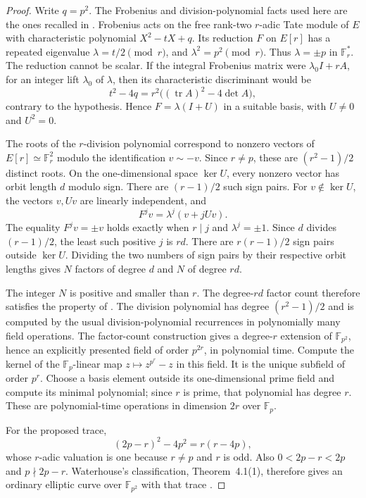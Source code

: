 \documentclass[11pt]{article}
\theoremstyle{definition}
\theoremstyle{remark}
\begin{document}
\begin{proof}
Write $q=p^2$.  The Frobenius and division-polynomial facts used here
are the ones recalled in \cite[\S2, pp.~485--486]{Schoof1985}.
Frobenius acts on the free rank-two $r$-adic Tate
module of $E$ with characteristic polynomial $X^2-tX+q$.
Its reduction $F$ on $E[r]$ has a repeated eigenvalue
$\lambda=t/2\pmod r$, and $\lambda^2=p^2\pmod r$.
Thus $\lambda=\pm p$ in $\mathbb F_r^*$.
The reduction cannot be scalar.  If the integral Frobenius matrix
were $\lambda_0I+rA$, for an integer lift $\lambda_0$ of $\lambda$,
then its characteristic discriminant would be
\[
 t^2-4q=r^2\bigl((\operatorname{tr}A)^2-4\det A\bigr),
\]
contrary to the hypothesis.  Hence
$F=\lambda(I+U)$ in a suitable basis, with $U\ne0$ and $U^2=0$.

The roots of the $r$-division polynomial correspond to nonzero
vectors of $E[r]\simeq\mathbb F_r^2$ modulo the identification
$v\sim-v$.  Since $r\ne p$, these are $(r^2-1)/2$ distinct roots.
On the one-dimensional space $\ker U$, every nonzero vector has
orbit length $d$ modulo sign.  There are $(r-1)/2$ such sign pairs.
For $v\notin\ker U$, the vectors $v,Uv$ are linearly independent,
and
\[
 F^jv=\lambda^j(v+jUv).
\]
The equality $F^jv=\pm v$ holds exactly when $r\mid j$ and
$\lambda^j=\pm1$.  Since $d$ divides $(r-1)/2$, the least such
positive $j$ is $rd$.
There are $r(r-1)/2$ sign pairs outside $\ker U$.
Dividing the two numbers of sign pairs by their respective orbit
lengths gives $N$ factors of degree $d$ and $N$ of degree $rd$.

The integer $N$ is positive and smaller than $r$.
The degree-$rd$ factor count therefore satisfies the property of
\cite[Property~1.1 and Theorem~1.4, p.~2]{BhargavaEtAl2017}.
The division polynomial has degree $(r^2-1)/2$ and is computed by
the usual division-polynomial recurrences in polynomially many
field operations.  The factor-count construction gives a
degree-$r$ extension of $\mathbb F_{p^2}$, hence an explicitly
presented field of order $p^{2r}$, in polynomial time.
Compute the kernel of the $\mathbb F_p$-linear map
$z\mapsto z^{p^r}-z$ in this field.
It is the unique subfield of order $p^r$.
Choose a basis element outside its one-dimensional prime field and
compute its minimal polynomial; since $r$ is prime, that polynomial
has degree $r$.  These are polynomial-time operations in dimension
$2r$ over $\mathbb F_p$.

For the proposed trace,
\[
 (2p-r)^2-4p^2=r(r-4p),
\]
whose $r$-adic valuation is one because $r\ne p$ and $r$ is odd.
Also $0<2p-r<2p$ and $p\nmid2p-r$.
Waterhouse's classification, Theorem~4.1(1), therefore gives an
ordinary elliptic curve over $\mathbb F_{p^2}$ with that trace
\cite[p.~536]{Waterhouse1969}.
\end{proof}
\end{document}
